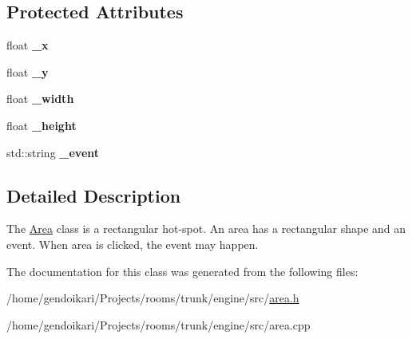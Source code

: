 \subsection*{Protected Attributes}
\begin{DoxyCompactItemize}
\item 
\hypertarget{classArea_a28a39abd1c5f8fe0b622575177cb97d8}{
float {\bfseries \_\-x}}
\label{classArea_a28a39abd1c5f8fe0b622575177cb97d8}

\item 
\hypertarget{classArea_a7f4a06384b48a53b47f6dea0b0e661c0}{
float {\bfseries \_\-y}}
\label{classArea_a7f4a06384b48a53b47f6dea0b0e661c0}

\item 
\hypertarget{classArea_afad994d8fc84b6ece47a6d78093e4dfa}{
float {\bfseries \_\-width}}
\label{classArea_afad994d8fc84b6ece47a6d78093e4dfa}

\item 
\hypertarget{classArea_a0b056adf6b5c50330bb006f0130aaf36}{
float {\bfseries \_\-height}}
\label{classArea_a0b056adf6b5c50330bb006f0130aaf36}

\item 
\hypertarget{classArea_aec66da74448aaa22a1860badc1947c64}{
std::string {\bfseries \_\-event}}
\label{classArea_aec66da74448aaa22a1860badc1947c64}

\end{DoxyCompactItemize}


\subsection{Detailed Description}
The \hyperlink{classArea}{Area} class is a rectangular hot-\/spot. An area has a rectangular shape and an event. When area is clicked, the event may happen. 

The documentation for this class was generated from the following files:\begin{DoxyCompactItemize}
\item 
/home/gendoikari/Projects/rooms/trunk/engine/src/\hyperlink{area_8h}{area.h}\item 
/home/gendoikari/Projects/rooms/trunk/engine/src/area.cpp\end{DoxyCompactItemize}
